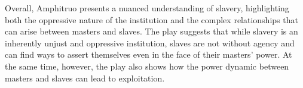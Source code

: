 \documentclass[letterpaper, reqno,11pt]{article}
\begin{document}
\medskip

Overall, Amphitruo presents a nuanced understanding of slavery, highlighting both the oppressive nature of the institution and the complex relationships that can arise between masters and slaves. The play suggests that while slavery is an inherently unjust and oppressive institution, slaves are not without agency and can find ways to assert themselves even in the face of their masters' power. At the same time, however, the play also shows how the power dynamic between masters and slaves can lead to exploitation. 
\end{document}
